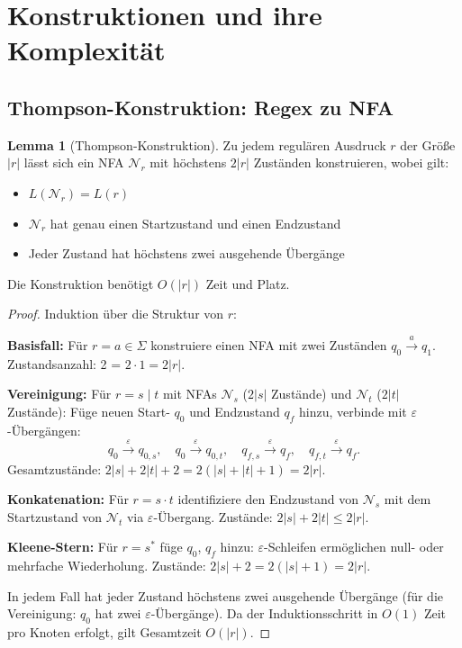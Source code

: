 ﻿\documentclass[a4paper,12pt]{article}
\theoremstyle{definition}
\newtheorem{lemma}{Lemma}
\begin{document}
\section{Konstruktionen und ihre Komplexität}

\subsection{Thompson-Konstruktion: Regex zu NFA}

\begin{lemma}[Thompson-Konstruktion]
	\label{lem:thompson}
	Zu jedem regulären Ausdruck $r$ der Größe $|r|$ lässt sich ein NFA
	$\mathcal{N}_r$ mit höchstens $2|r|$ Zuständen konstruieren, wobei gilt:
	\begin{itemize}
		\item $L(\mathcal{N}_r) = L(r)$
		\item $\mathcal{N}_r$ hat genau einen Startzustand und einen Endzustand
		\item Jeder Zustand hat höchstens zwei ausgehende Übergänge
	\end{itemize}
	Die Konstruktion benötigt $O(|r|)$ Zeit und Platz.
\end{lemma}

\begin{proof}
	Induktion über die Struktur von $r$:

	\textbf{Basisfall:} Für $r = a \in \Sigma$ konstruiere einen NFA mit zwei
	Zuständen $q_0 \xrightarrow{a} q_1$. Zustandsanzahl: 2 = $2 \cdot 1 = 2|r|$.

	\textbf{Vereinigung:} Für $r = s \mid t$ mit NFAs $\mathcal{N}_s$ ($2|s|$
	Zustände) und $\mathcal{N}_t$ ($2|t|$ Zustände): Füge neuen Start- $q_0$ und
	Endzustand $q_f$ hinzu, verbinde mit $\varepsilon$-Übergängen:
	\[
		q_0 \xrightarrow{\varepsilon} q_{0,s},\quad
		q_0 \xrightarrow{\varepsilon} q_{0,t},\quad
		q_{f,s} \xrightarrow{\varepsilon} q_f,\quad
		q_{f,t} \xrightarrow{\varepsilon} q_f.
	\]
	Gesamtzustände: $2|s| + 2|t| + 2 = 2(|s|+|t|+1) = 2|r|$.

	\textbf{Konkatenation:} Für $r = s \cdot t$ identifiziere den Endzustand von
	$\mathcal{N}_s$ mit dem Startzustand von $\mathcal{N}_t$ via
	$\varepsilon$-Übergang. Zustände: $2|s| + 2|t| \leq 2|r|$.

	\textbf{Kleene-Stern:} Für $r = s^*$ füge $q_0$, $q_f$ hinzu:
	$\varepsilon$-Schleifen ermöglichen null- oder mehrfache Wiederholung.
	Zustände: $2|s| + 2 = 2(|s|+1) = 2|r|$.

	In jedem Fall hat jeder Zustand höchstens zwei ausgehende Übergänge (für die
	Vereinigung: $q_0$ hat zwei $\varepsilon$-Übergänge). Da der Induktionsschritt
	in $O(1)$ Zeit pro Knoten erfolgt, gilt Gesamtzeit $O(|r|)$. \qedhere
\end{proof}
\end{document}
